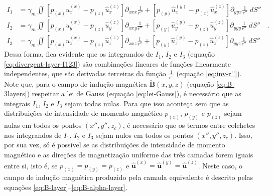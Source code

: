 \begin{equation}
\begin{split}
I_{1} &= \gamma_{m} \iint
\left[ p_{(x)} \hat{u}^{(x)}_{x} - p_{(z)} \hat{u}^{(z)}_{x} \right] \partial_{xxx} \frac{1}{r''} +
\left[ p_{(y)} \hat{u}^{(y)}_{x} - p_{(z)} \hat{u}^{(z)}_{x} \right] \partial_{yyx} \frac{1}{r''} 
\; dS'' \\
I_{2} &= \gamma_{m} \iint
\left[ p_{(x)} \hat{u}^{(x)}_{y} - p_{(z)} \hat{u}^{(z)}_{y} \right] \partial_{xxy} \frac{1}{r''} +
\left[ p_{(y)} \hat{u}^{(y)}_{y} - p_{(z)} \hat{u}^{(z)}_{y} \right] \partial_{yyy} \frac{1}{r''} 
\; dS'' \\
I_{3} &= \gamma_{m} \iint
\left[ p_{(x)} \hat{u}^{(x)}_{z} - p_{(z)} \hat{u}^{(z)}_{z} \right] \partial_{xxz} \frac{1}{r''} +
\left[ p_{(y)} \hat{u}^{(y)}_{z} - p_{(z)} \hat{u}^{(z)}_{z} \right] \partial_{yyz} \frac{1}{r''} 
\; dS''
\label{eq:divergent-layer-I123}
\end{split} \:\: .
\end{equation}
Dessa forma, fica evidente que os integrandos de $I_{1}$, $I_{2}$ e $I_{3}$ (equação \ref{eq:divergent-layer-I123}) 
são combinações lineares de funções linearmente independentes, que são derivadas 
terceiras da função $\frac{1}{r''}$ (equação \ref{eq:inv-r''}).
Note que, para o campo de indução magnética $\breve{\mathbf{B}}(x, y, z)$ (equação \ref{eq:B-3layers}) 
respeitar a lei de Gauss (equação \ref{eq:lei-Gauss}), é necessário que as integrais $I_{1}$, $I_{2}$ e $I_{3}$ 
sejam todas nulas.
Para que isso aconteça sem que as distribuições de intensidade de momento magnético 
$p_{(x)}$, $p_{(y)}$ e $p_{(z)}$ sejam nulas em todos os pontos $(x'', y'', z_{c})$, é necessário 
que os termos entre colchetes
nos integrandos de $I_{1}$, $I_{2}$ e $I_{3}$ sejam nulos em todos os pontos $(x'', y'', z_{c})$.
Isso, por sua vez, só é possível se as distribuições de intensidade de momento magnético 
e as direções de magnetização uniforme das três camadas forem iguais entre si, isto é, se 
$p_{(x)} = p_{(y)} = p_{(z)}$ e 
$\hat{\mathbf{u}}^{(x)} = \hat{\mathbf{u}}^{(y)} = \hat{\mathbf{u}}^{(z)}$.
Neste caso, o campo de indução magnética produzido pela camada equivalente é descrito pelas equações 
\ref{eq:B-layer}--\ref{eq:B-alpha-layer}.

